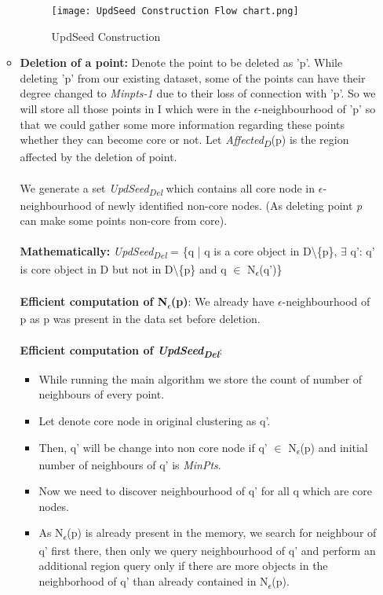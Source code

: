 \documentclass[acmsmall]{acmart}
\begin{document}
\begin{enumerate}
\begin{itemize}
        \begin{figure}[!h]
            \centering
            \texttt{[image: UpdSeed Construction Flow chart.png]}
            \caption{UpdSeed Construction}
            \label{fig:my_label}
        \end{figure}
        
        \item \textbf{Deletion of a point:} Denote the point to be deleted as 'p'. While deleting 'p' from our existing dataset, some of the points can have their degree changed to \textit{Minpts-1} due to their loss of connection with 'p'. So we will store all those points in I which were in the $\epsilon$-neighbourhood of 'p' so that we could gather some more information regarding these points whether they can become core or not. \newline
        Let \textit{Affected}\textsubscript{$D$}(p) is the region affected by the deletion of point. \\ \\
        We generate a set \textit{UpdSeed\textsubscript{Del}} which contains all core node in $\epsilon$-neighbourhood of newly identified non-core nodes. (As deleting point \textit{p} can make some points non-core from core).\\ \\ \textbf{Mathematically:} \textit{UpdSeed\textsubscript{Del}} = \{q | q is a core object in D\textbackslash \{p\}, $\exists$ q’: q’ is core object in D but not in D\textbackslash \{p\} and q $\in$ N\textsubscript{$\epsilon$}(q')\} \\ \\
        \textbf{Efficient computation of N\textsubscript{$\epsilon$}(p)}:
        We already have $\epsilon$-neighbourhood of p as p was present in the data set before deletion.\\ \\
        \textbf{Efficient computation of \textit{UpdSeed\textsubscript{Del}}}:
        \begin{itemize}
            \item While running the main algorithm we store the count of number of neighbours of every point.
            \item Let denote core node in original clustering as q'.
            \item Then, q' will be change into non core node if q' $\in$ N\textsubscript{$\epsilon$}(p) and initial number of neighbours of  q' is \textit{MinPts}.
            \item Now we need to discover neighbourhood of q' for all q which are core nodes.
            \item As N\textsubscript{$\epsilon$}(p) is already present in the memory, we search for neighbour of q' first there, then only we query neighbourhood of q’ and perform an additional region query only if there are more objects in the neighborhood of q’ than already contained in N\textsubscript{$\epsilon$}(p). \\ \\
        \end{itemize}
        

\end{itemize}
\end{enumerate}
\end{document}
